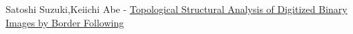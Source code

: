 \documentclass[a4paper, 14pt]{article}
\begin{document}
\newpage
\begin{thebibliography}{}
	
	
		  Satoshi Suzuki,Keiichi Abe   -  \href{https://www.sciencedirect.com/science/article/abs/pii/0734189X85900167}{Topological Structural Analysis of Digitized Binary Images by Border Following}
	
	

		


\end{thebibliography}
	



	
\end{document}
